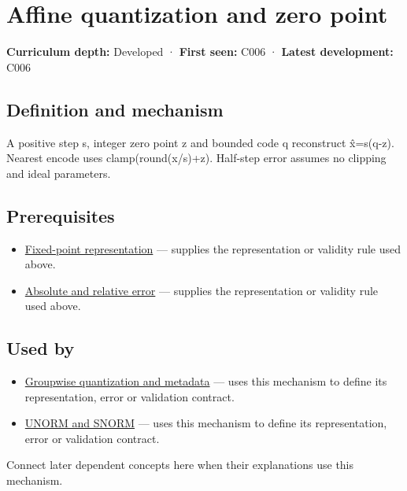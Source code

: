 \hypertarget{appendix-d5da3eaabaef}{}
\section{Affine quantization and zero point}\label{appendix-d5da3eaabaef-affine-quantization-and-zero-point}

\textbf{Curriculum depth:} Developed · \textbf{First seen:} C006 · \textbf{Latest development:} C006

\subsection{Definition and mechanism}\label{appendix-d5da3eaabaef-definition-and-mechanism}

A positive step s, integer zero point z and bounded code q reconstruct x̂=s(q-z). Nearest encode uses clamp(round(x/s)+z). Half-step error assumes no clipping and ideal parameters.

\subsection{Prerequisites}\label{appendix-d5da3eaabaef-prerequisites}

\begin{itemize}
\tightlist
\item
  \hyperref[appendix-1d0dbe8924cc]{Fixed-point representation} --- supplies the representation or validity rule used above.
\item
  \hyperref[appendix-3ae74e89b4e6]{Absolute and relative error} --- supplies the representation or validity rule used above.
\end{itemize}

\subsection{Used by}\label{appendix-d5da3eaabaef-used-by}

\begin{itemize}
\tightlist
\item
  \hyperref[appendix-638204c40e8b]{Groupwise quantization and metadata} --- uses this mechanism to define its representation, error or validation contract.
\item
  \hyperref[appendix-b2402c453dac]{UNORM and SNORM} --- uses this mechanism to define its representation, error or validation contract.
\end{itemize}

Connect later dependent concepts here when their explanations use this mechanism.


